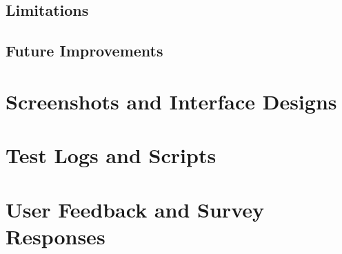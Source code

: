 \documentclass[12pt,a4paper]{report}
\begin{document}
\section{Limitations}
\section{Future Improvements}

\appendix
\chapter{Screenshots and Interface Designs}
\chapter{Test Logs and Scripts}
\chapter{User Feedback and Survey Responses}

\end{document}
